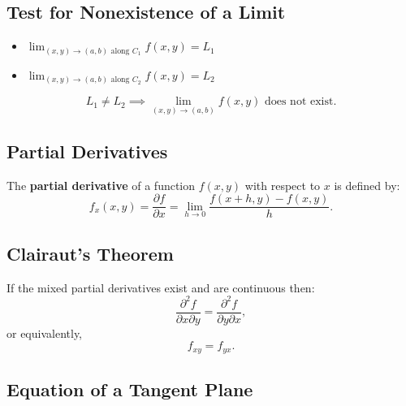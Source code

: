 \documentclass[a4paper,11pt]{article}
\begin{document}


\subsection{Test for Nonexistence of a Limit}

\begin{tcolorbox}
    \begin{multicols}{2}
        \begin{itemize}
            \item \large $\lim_{(x,y) \to (a,b) \text{ along } C_1} f(x,y) = L_1$
            \item \large $\lim_{(x,y) \to (a,b) \text{ along } C_2} f(x,y) = L_2$
        \end{itemize}
    \end{multicols}
    \[
    L_1 \neq L_2 \implies \lim_{(x,y) \to (a,b)} f(x, y) \text{ does not exist.}
    \]
\end{tcolorbox}




\subsection{Partial Derivatives}

\begin{tcolorbox}
    The \textbf{partial derivative} of a function $f(x,y)$ with respect to $x$ is defined by:
    \[
    f_x(x,y) = \frac{\partial f}{\partial x} = \lim_{h \to 0} \frac{f(x+h,y)-f(x,y)}{h}.
    \]
\end{tcolorbox}




\subsection{Clairaut’s Theorem}

\begin{tcolorbox}
    If the mixed partial derivatives exist and are continuous then:
    \[
    \frac{\partial ^2 f}{\partial x \partial y} = \frac{\partial ^2 f}{\partial y \partial x},
    \]
    or equivalently,
    \[
    f_{xy} = f_{yx}.
    \]
\end{tcolorbox}




\subsection{Equation of a Tangent Plane}
\end{document}
